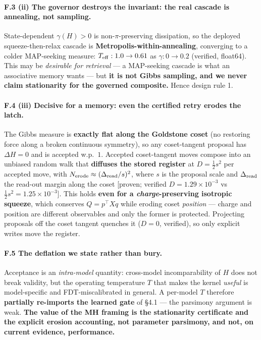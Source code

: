 \documentclass[11pt]{article}
\newcommand{\half}{\tfrac12}
\begin{document}
\paragraph{F.3 (ii) The governor destroys the invariant: the real cascade is annealing, not sampling.} State-dependent $\gamma(H)>0$ is non-$\pi$-preserving dissipation, so the deployed squeeze-then-relax cascade is \textbf{Metropolis-within-annealing}, converging to a colder MAP-seeking measure: $T_{\rm eff}:1.0\to0.61$ as $\gamma:0\to0.2$ (verified, float64). This may be \emph{desirable for retrieval} --- a MAP-seeking cascade is what an associative memory wants --- but \textbf{it is not Gibbs sampling, and we never claim stationarity for the governed composite.} Hence design rule 1.

\paragraph{F.4 (iii) Decisive for a memory: even the certified retry erodes the latch.} The Gibbs measure is \textbf{exactly flat along the Goldstone coset} (no restoring force along a broken continuous symmetry), so any coset-tangent proposal has $\Delta H=0$ and is accepted w.p.\ $1$. Accepted coset-tangent moves compose into an unbiased random walk that \textbf{diffuses the stored register} at $D=\half s^2$ per accepted move, with $N_{\rm erode}\approx(\Delta_{\rm read}/s)^2$, where $s$ is the proposal scale and $\Delta_{\rm read}$ the read-out margin along the coset [proven; verified $D=1.29{\times}10^{-3}$ vs $\half s^2=1.25{\times}10^{-3}$]. This holds \textbf{even for a \emph{charge}-preserving isotropic squeeze}, which conserves $Q=p^\top Xq$ while eroding coset \emph{position} --- charge and position are different observables and only the former is protected. Projecting proposals off the coset tangent quenches it ($D=0$, verified), so only explicit writes move the register.

\paragraph{F.5 The deflation we state rather than bury.} Acceptance is an \emph{intra-model} quantity: cross-model incomparability of $H$ does not break validity, but the operating temperature $T$ that makes the kernel \emph{useful} is model-specific and FDT-miscalibrated in general. A per-model $T$ therefore \textbf{partially re-imports the learned gate} of \S4.1 --- the parsimony argument is weak. \textbf{The value of the MH framing is the stationarity certificate and the explicit erosion accounting, not parameter parsimony, and not, on current evidence, performance.}
\end{document}
